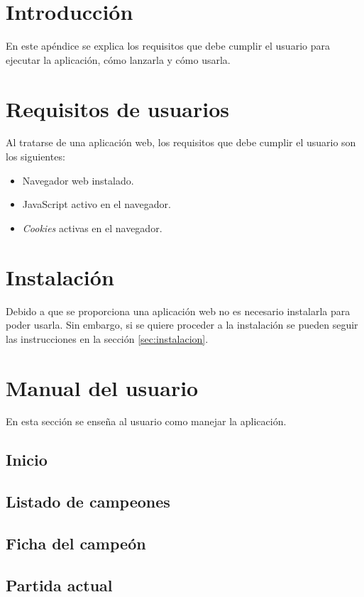 
\section{Introducción}
En este apéndice se explica los requisitos que debe cumplir el usuario para ejecutar la aplicación, cómo lanzarla y cómo usarla.

\section{Requisitos de usuarios}
Al tratarse de una aplicación web, los requisitos que debe cumplir el usuario son los siguientes:

\begin{itemize}
	\tightlist
	\item Navegador web instalado.
	\item JavaScript activo en el navegador.
	\item \textit{Cookies} activas en el navegador.
\end{itemize}


\section{Instalación}
Debido a que se proporciona una aplicación web no es necesario instalarla para poder usarla. Sin embargo, si se quiere proceder a la instalación se pueden seguir las instrucciones en la sección \ref{sec:instalacion}.


\section{Manual del usuario}
En esta sección se enseña al usuario como manejar la aplicación.

\subsection{Inicio}


\subsection{Listado de campeones}

\subsection{Ficha del campeón}

\subsection{Partida actual}